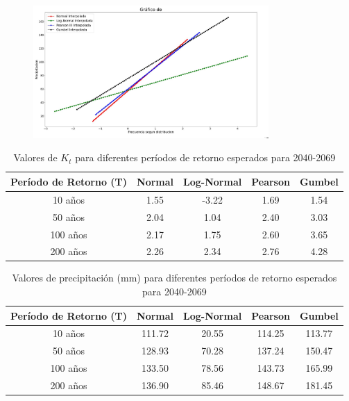 \documentclass{article}  %
\begin{document}
\begin{figure}[H]
  \centering
  \includegraphics[width=0.8\textwidth]{grafico_b_interpolado.jpg}
  \caption{}
  \label{fig:grafico_b_interpolado}
\end{figure}

\begin{table}[H]
  \centering
  \caption{Valores de \( K_t \) para diferentes períodos de retorno esperados para 2040-2069}
  \begin{tabular}{|c|c|c|c|c|}
  \hline
  \textbf{Período de Retorno (T)} & \textbf{Normal} & \textbf{Log-Normal} & \textbf{Pearson} & \textbf{Gumbel} \\ \hline
  10 años  & 1.55 & -3.22 & 1.69 & 1.54 \\ \hline
  50 años  & 2.04 & 1.04  & 2.40 & 3.03 \\ \hline
  100 años & 2.17 & 1.75  & 2.60 & 3.65 \\ \hline
  200 años & 2.26 & 2.34  & 2.76 & 4.28 \\ \hline
  \end{tabular}
\end{table}

\begin{table}[H]
  \centering
  \caption{Valores de precipitación (mm) para diferentes períodos de retorno esperados para 2040-2069}
  \begin{tabular}{|c|c|c|c|c|}
  \hline
  \textbf{Período de Retorno (T)} & \textbf{Normal} & \textbf{Log-Normal} & \textbf{Pearson} & \textbf{Gumbel} \\ \hline
  10 años  & 111.72 & 20.55 & 114.25 & 113.77 \\ \hline
  50 años  & 128.93 & 70.28 & 137.24 & 150.47 \\ \hline
  100 años & 133.50 & 78.56 & 143.73 & 165.99 \\ \hline
  200 años & 136.90 & 85.46 & 148.67 & 181.45 \\ \hline
  \end{tabular}
\end{table}
\end{document}
